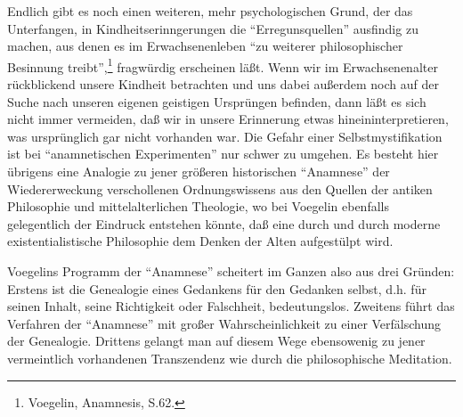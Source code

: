 Endlich gibt es noch einen weiteren, mehr psychologischen Grund, der das
Unterfangen, in Kindheitserinngerungen die "`Erregunsquellen"' ausfindig zu
machen, aus denen es im Erwachsenenleben "`zu weiterer philosophischer
Besinnung treibt"',\footnote{Voegelin, Anamnesis, S.62.} fragwürdig erscheinen
läßt. Wenn wir im Erwachsenenalter rückblickend unsere Kindheit betrachten und
uns dabei außerdem noch auf der Suche nach unseren eigenen geistigen Ursprüngen
befinden, dann läßt es sich nicht immer vermeiden, daß wir in unsere Erinnerung
etwas hineininterpretieren, was ursprünglich gar nicht vorhanden war. Die
Gefahr einer Selbstmystifikation ist bei "`anamnetischen Experimenten"' nur
schwer zu umgehen. Es besteht hier übrigens eine Analogie zu jener größeren
historischen "`Anamnese"' der Wiedererweckung verschollenen Ordnungswissens
aus den Quellen der antiken Philosophie und mittelalterlichen Theologie, wo
bei Voegelin ebenfalls gelegentlich der Eindruck entstehen könnte, daß eine
durch und durch moderne existentialistische Philosophie dem Denken der Alten
aufgestülpt wird.

Voegelins Programm der "`Anamnese"' scheitert im Ganzen also aus drei Gründen:
Erstens ist die Genealogie eines Gedankens für den Gedanken selbst, d.h. für
seinen Inhalt, seine Richtigkeit oder Falschheit, bedeutungslos.
Zweitens führt das Verfahren der "`Anamnese"' mit großer Wahrscheinlichkeit zu
einer Verfälschung der Genealogie. Drittens gelangt man auf diesem Wege
ebensowenig zu jener vermeintlich vorhandenen Transzendenz wie durch die
philosophische Meditation.














